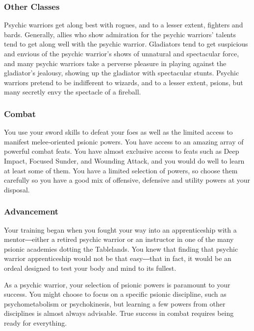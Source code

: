 \subsubsection{Other Classes}

Psychic warriors get along best with rogues, and to a lesser extent, fighters and bards. Generally, allies who show admiration for the psychic warriors’ talents tend to get along well with the psychic warrior. Gladiators tend to get suspicious and envious of the psychic warrior’s shows of unnatural and spectacular force, and many psychic warriors take a perverse pleasure in playing against the gladiator’s jealousy, showing up the gladiator with spectacular stunts. Psychic warriors pretend to be indifferent to wizards, and to a lesser extent, psions, but many secretly envy the spectacle of a fireball.

\subsubsection{Combat}

You use your sword skills to defeat your foes as well as the limited access to manifest melee‐oriented psionic powers. You have access to an amazing array of powerful combat feats. You have almost exclusive access to feats such as Deep Impact, Focused Sunder, and Wounding Attack, and you would do well to learn at least some of them. You have a limited selection of powers, so choose them carefully so you have a good mix of offensive, defensive and utility powers at your disposal.

\subsubsection{Advancement}

Your training began when you fought your way into an apprenticeship with a mentor―either a retired psychic warrior or an instructor in one of the many psionic academies dotting the Tablelands. You knew that finding that psychic warrior apprenticeship would not be that easy―that in fact, it would be an ordeal designed to test your body and mind to its fullest.

As a psychic warrior, your selection of psionic powers is paramount to your success. You might choose to focus on a specific psionic discipline, such as psychometabolism or psychokinesis, but learning a few powers from other disciplines is almost always advisable. True success in combat requires being ready for everything.

